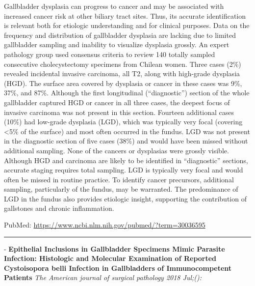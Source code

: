 \documentclass[]{article}
\begin{document}
Gallbladder dysplasia can progress to cancer and may be associated with
increased cancer risk at other biliary tract sites. Thus, its accurate
identification is relevant both for etiologic understanding and for
clinical purposes. Data on the frequency and distribution of gallbladder
dysplasia are lacking due to limited gallbladder sampling and inability
to visualize dysplasia grossly. An expert pathology group used consensus
criteria to review 140 totally sampled consecutive cholecystectomy
specimens from Chilean women. Three cases (2\%) revealed incidental
invasive carcinoma, all T2, along with high-grade dysplasia (HGD). The
surface area covered by dysplasia or cancer in these cases was 9\%,
37\%, and 87\%. Although the first longitudinal (``diagnostic'') section
of the whole gallbladder captured HGD or cancer in all three cases, the
deepest focus of invasive carcinoma was not present in this section.
Fourteen additional cases (10\%) had low-grade dysplasia (LGD), which
was typically very focal (covering \textless{}5\% of the surface) and
most often occurred in the fundus. LGD was not present in the diagnostic
section of five cases (38\%) and would have been missed without
additional sampling. None of the cancers or dysplasias were grossly
visible. Although HGD and carcinoma are likely to be identified in
``diagnostic'' sections, accurate staging requires total sampling. LGD
is typically very focal and would often be missed in routine practice.
To identify cancer precursors, additional sampling, particularly of the
fundus, may be warranted. The predominance of LGD in the fundus also
provides etiologic insight, supporting the contribution of gallstones
and chronic inflammation.

PubMed: \url{https://www.ncbi.nlm.nih.gov/pubmed/?term=30036595}

{}

{}

\begin{center}\rule{0.5\linewidth}{\linethickness}\end{center}

 - \textbf{Epithelial Inclusions in Gallbladder Specimens Mimic Parasite
Infection: Histologic and Molecular Examination of Reported Cystoisopora
belli Infection in Gallbladders of Immunocompetent Patients} \emph{The
American journal of surgical pathology 2018 Jul;():}
\end{document}
